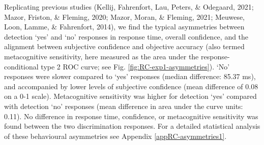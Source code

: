 \documentclass[12pt,twoside]{reedthesis}
\begin{document}
Replicating previous studies (Kellij, Fahrenfort, Lau, Peters, \& Odegaard, 2021; Mazor, Friston, \& Fleming, 2020; Mazor, Moran, \& Fleming, 2021; Meuwese, Loon, Lamme, \& Fahrenfort, 2014), we find the typical asymmetries between detection `yes' and `no' responses in response time, overall confidence, and the alignment between subjective confidence and objective accuracy (also termed metacognitive sensitivity, here measured as the area under the response-conditional type 2 ROC curve; see Fig. \ref{fig:RC-exp1-asymmetries}). `No' responses were slower compared to `yes' responses (median difference: 85.37 ms), and accompanied by lower levels of subjective confidence (mean difference of 0.08 on a 0-1 scale). Metacognitive sensitivity was higher for detection `yes' compared with detection `no' responses (mean difference in area under the curve units: 0.11). No difference in response time, confidence, or metacognitive sensitivity was found between the two discrimination responses. For a detailed statistical analysis of these behavioural asymmetries see Appendix \ref{appRC-asymmetries1}.
\end{document}
